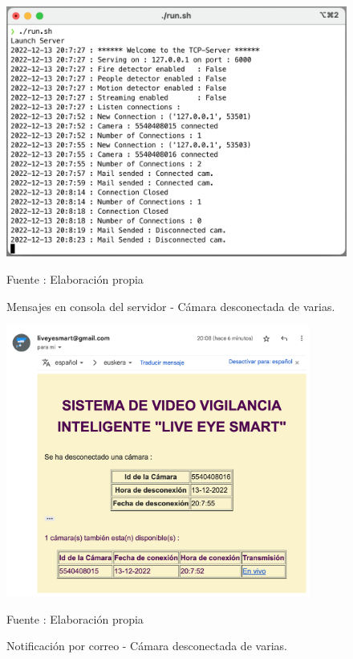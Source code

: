 \begin{figure}[H]
    \begin{center}
        \includegraphics[width=12cm]{img/capitulo_6/cam_disconnected_n_cams.png}
    \end{center}
    \begin{center}
        \caption{Mensajes en consola del servidor - Cámara desconectada de varias.}
        Fuente : Elaboración propia
    \end{center}
\end{figure}

\begin{figure}[H]
    \begin{center}
        \includegraphics[width=10cm]{img/capitulo_6/mail3.png}
    \end{center}
    \begin{center}
        \caption{Notificación por correo - Cámara desconectada de varias.}
        Fuente : Elaboración propia
    \end{center}
\end{figure}

